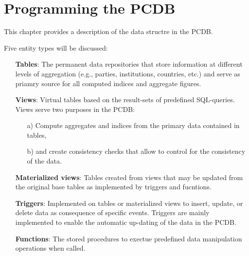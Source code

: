 \chapter{Programming the PCDB}\label{chap_programming_the_PCDB}

This chapter provides a description of the data structre in the PCDB. 

Five entity types will be discussed:
\begin{itemize}
\item[]{{\bf Tables}: 
  The permanent data repositories that store information at different levels of aggregation (e.g., parties, institutions, countries, etc.) and serve as priamry source for all computed indices and aggregate figures.}
\item[]{{\bf Views}: 
  Virtual tables based on the result-sets of predefined SQL-queries.
  Views serve two purposes in the PCDB:
  \begin{itemize}
    \item[a)]Compute aggregates and indices from the primary data contained in tables,
    \item[b)]and create consistency checks that allow to control for the consistency of the data.
  \end{itemize}}
\item[]{{\bf Materialized views}: Tables created from views that may be updated from the original base tables as implemented by triggers and fucntions.}
\item[]{{\bf Triggers}: 
  Implemented on tables or materialized views to insert, update, or delete data as consequence of specific events. 
  Triggers are mainly implemented to enable the automatic up-dating of the data in the PCDB.}
\item[]{{\bf Functions}: The stored procedures to exectue predefined data manipulation operations when called.} 
\end{itemize}
